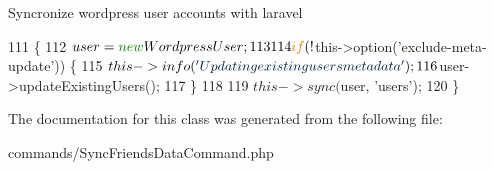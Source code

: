 Syncronize wordpress user accounts with laravel 
\begin{DoxyCode}
111     \{
112         $user = \textcolor{keyword}{new} WordpressUser;
113 
114         \textcolor{keywordflow}{if} (!$this->option(\textcolor{stringliteral}{'exclude-meta-update'})) \{
115             $this->info(\textcolor{stringliteral}{'Updating existing users metadata'});
116             $user->updateExistingUsers();
117         \}
118 
119         $this->sync($user, \textcolor{stringliteral}{'users'});
120     \}
\end{DoxyCode}


The documentation for this class was generated from the following file\-:\begin{DoxyCompactItemize}
\item 
commands/Sync\-Friends\-Data\-Command.\-php\end{DoxyCompactItemize}
